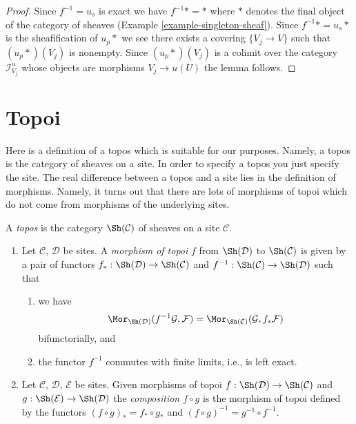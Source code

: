 \begin{proof}
Since $f^{-1} = u_s$ is exact we have $f^{-1}* = *$ where $*$ denotes the
final object of the category of sheaves
(Example \ref{example-singleton-sheaf}).
Since $f^{-1}* = u_s*$ is the sheafification of $u_p*$ we see
there exists a covering $\{V_j \to V\}$ such that $(u_p*)(V_j)$
is nonempty. Since $(u_p*)(V_j)$ is a colimit over the category
$\mathcal{I}^u_{V_j}$ whose objects are morphisms $V_j \to u(U)$
the lemma follows.
\end{proof}



























\section{Topoi}
\label{section-topoi}

\noindent
Here is a definition of a topos which is suitable for our purposes.
Namely, a topos is the category of sheaves on a site. In order to specify
a topos you just specify the site. The real difference between a topos
and a site lies in the definition of morphisms. Namely, it turns out that
there are lots of morphisms of topoi which do not come from morphisms
of the underlying sites.

\begin{definition}[Topoi]
\label{definition-topos}
A {\it topos} is the category $\Sh(\mathcal{C})$ of sheaves
on a site $\mathcal{C}$.
\begin{enumerate}
\item Let $\mathcal{C}$, $\mathcal{D}$ be sites.
A {\it morphism of topoi} $f$ from $\Sh(\mathcal{D})$
to $\Sh(\mathcal{C})$ is given by a pair of functors
$f_* : \Sh(\mathcal{D}) \to \Sh(\mathcal{C})$
and
$f^{-1} : \Sh(\mathcal{C}) \to \Sh(\mathcal{D})$
such that
\begin{enumerate}
\item we have
$$
\Mor_{\Sh(\mathcal{D})}(f^{-1}\mathcal{G}, \mathcal{F})
=
\Mor_{\Sh(\mathcal{C})}(\mathcal{G}, f_*\mathcal{F})
$$
bifunctorially, and
\item the functor $f^{-1}$ commutes with finite limits, i.e.,
is left exact.
\end{enumerate}
\item Let $\mathcal{C}$, $\mathcal{D}$, $\mathcal{E}$ be sites.
Given morphisms of topoi
$f :\Sh(\mathcal{D}) \to \Sh(\mathcal{C})$ and
$g :\Sh(\mathcal{E}) \to \Sh(\mathcal{D})$ the
{\it composition $f\circ g$} is the morphism of topoi defined
by the functors
$(f \circ g)_* = f_* \circ g_*$ and
$(f \circ g)^{-1} = g^{-1} \circ f^{-1}$.
\end{enumerate}
\end{definition}

